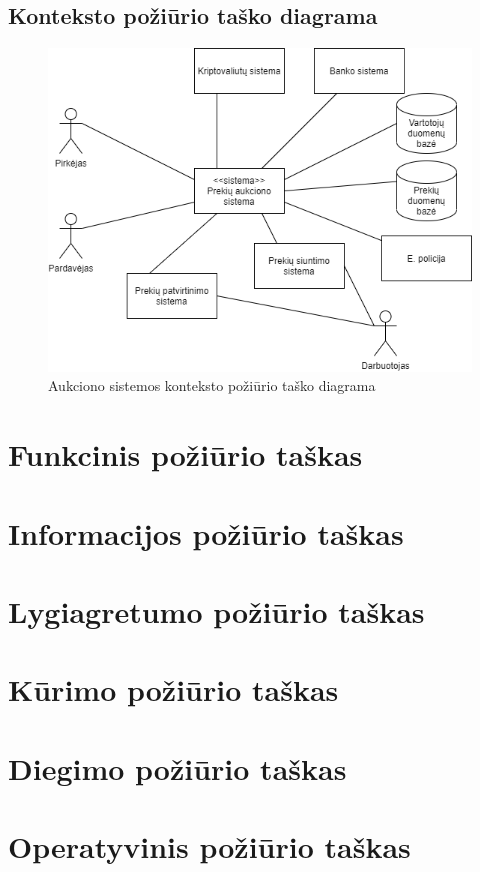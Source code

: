 \documentclass{VUMIFPSmagistrinis}
\begin{document}
			\subsection{Konteksto požiūrio taško diagrama}

				\begin{figure}[H]
				\centering
				\includegraphics[scale=0.9]{img/context}
				\caption{Aukciono sistemos konteksto požiūrio taško diagrama} %
				\label{img:text}
				\end{figure}
		\section{Funkcinis požiūrio taškas}
		\section{Informacijos požiūrio taškas}
		\section{Lygiagretumo požiūrio taškas}
		\section{Kūrimo požiūrio taškas}
		\section{Diegimo požiūrio taškas}
		\section{Operatyvinis požiūrio taškas}
		
\end{document}

